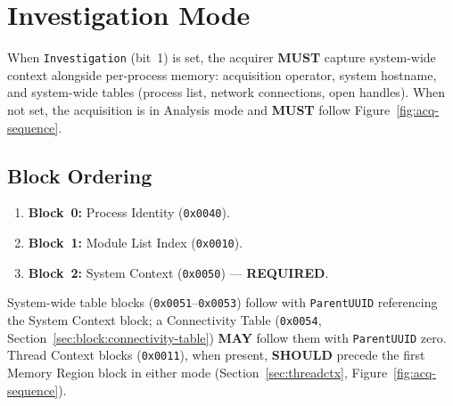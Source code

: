 \documentclass[11pt,a4paper]{article}
\newcommand{\MUST}{\textbf{MUST}}
\newcommand{\SHOULD}{\textbf{SHOULD}}
\newcommand{\MAY}{\textbf{MAY}}
\newcommand{\REQUIRED}{\textbf{REQUIRED}}
\newcommand{\hex}[1]{\texttt{0x#1}}
\newcommand{\field}[1]{\texttt{#1}}
\begin{document}
\newpage
\section{Investigation Mode}\label{sec:investigation}
When \field{Investigation} (bit~1) is set, the acquirer \MUST{} capture system-wide context alongside per-process memory: acquisition operator, system hostname, and system-wide tables (process list, network connections, open handles). When not set, the acquisition is in Analysis mode and \MUST{} follow Figure~\ref{fig:acq-sequence}.

\subsection{Block Ordering}\label{sec:blockordering}
\begin{enumerate}[leftmargin=1.8em, itemsep=2pt]
\item \textbf{Block~0:} Process Identity (\hex{0040}).
\item \textbf{Block~1:} Module List Index (\hex{0010}).
\item \textbf{Block~2:} System Context (\hex{0050}) --- \REQUIRED.
\end{enumerate}
System-wide table blocks (\hex{0051}--\hex{0053}) follow with \field{ParentUUID} referencing the System Context block; a Connectivity Table (\hex{0054}, Section~\ref{sec:block:connectivity-table}) \MAY{} follow them with \field{ParentUUID} zero. Thread Context blocks (\hex{0011}), when present, \SHOULD{} precede the first Memory Region block in either mode (Section~\ref{sec:threadctx}, Figure~\ref{fig:acq-sequence}).
\end{document}
